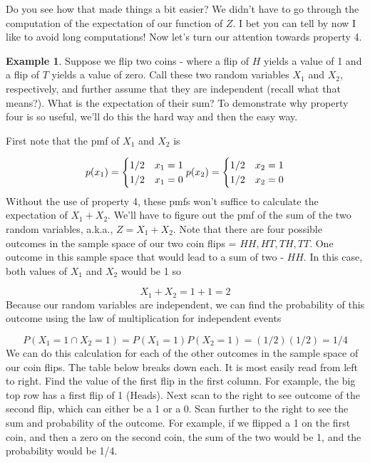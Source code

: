 \documentclass[
]{book}
\theoremstyle{definition}
\theoremstyle{definition}
\newtheorem{example}{Example}[chapter]
\theoremstyle{definition}
\theoremstyle{definition}
\theoremstyle{remark}
\begin{document}
Do you see how that made things a bit easier? We didn't have to go through the computation of the expectation of our function of \(Z\). I bet you can tell by now I like to avoid long computations! Now let's turn our attention towards property 4.

\begin{example}
\protect\hypertarget{exm:expectationsum}{}\label{exm:expectationsum}Suppose we flip two coins - where a flip of \(H\) yields a value of 1 and a flip of \(T\) yields a value of zero. Call these two random variables \(X_1\) and \(X_2\), respectively, and further assume that they are independent (recall what that means?). What is the expectation of their sum? To demonstrate why property four is so useful, we'll do this the hard way and then the easy way.

First note that the pmf of \(X_1\) and \(X_2\) is

\[
p(x_1) = 
\begin{cases}
1/2 & x_1 = 1 \\
1/2 & x_1 = 0 \\
\end{cases}
\\
p(x_2) = 
\begin{cases}
1/2 & x_2 = 1 \\
1/2 & x_2 = 0 \\
\end{cases}
\]
Without the use of property 4, these pmfs won't suffice to calculate the expectation of \(X_1 + X_2\). We'll have to figure out the pmf of the sum of the two random variables, a.k.a., \(Z = X_1 + X_2\). Note that there are four possible outcomes in the sample space of our two coin flips = \({HH, HT, TH, TT}\). One outcome in this sample space that would lead to a sum of two - \({HH}\). In this case, both values of \(X_1\) and \(X_2\) would be 1 so

\[
X_1 + X_2 = 1 + 1 = 2
\]
Because our random variables are independent, we can find the probability of this outcome using the law of multiplication for independent events

\[
P(X_1 = 1 \cap X_2 = 1) = P(X_1 = 1)P(X_2 = 1) = (1/2)(1/2) = 1/4
\]
We can do this calculation for each of the other outcomes in the sample space of our coin flips. The table below breaks down each. It is most easily read from left to right. Find the value of the first flip in the first column. For example, the big top row has a first flip of 1 (Heads). Next scan to the right to see outcome of the second flip, which can either be a 1 or a 0. Scan further to the right to see the sum and probability of the outcome. For example, if we flipped a 1 on the first coin, and then a zero on the second coin, the sum of the two would be 1, and the probability would be 1/4.


\end{example}
\end{document}
